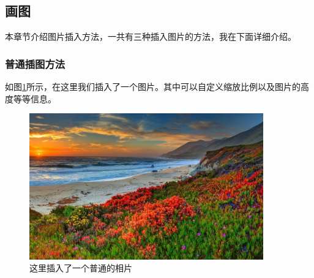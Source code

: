 \subsection{画图}
本章节介绍图片插入方法，一共有三种插入图片的方法，我在下面详细介绍。
\subsubsection{普通插图方法}
如图\ref{fig:my_pic1}所示，在这里我们插入了一个图片。其中可以自定义缩放比例以及图片的高度等等信息。
\begin{figure}[hbpt]
    \centering
    \includegraphics[width=0.9\textwidth]{figures/test.jpg}
    \caption{这里插入了一个普通的相片}
    \label{fig:my_pic1}
\end{figure}


